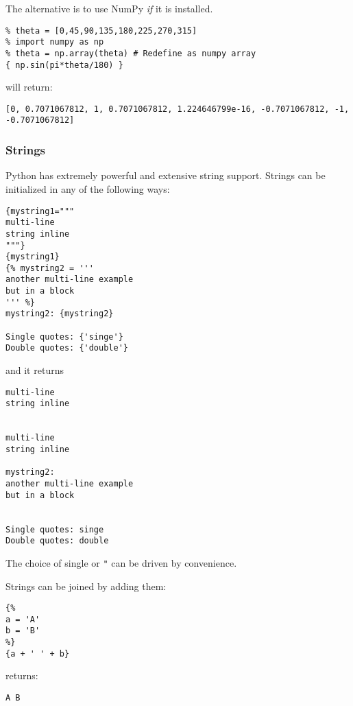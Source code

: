 The alternative is to use NumPy \emph{if} it is installed.

\begin{verbatim}
% theta = [0,45,90,135,180,225,270,315]
% import numpy as np
% theta = np.array(theta) # Redefine as numpy array
{ np.sin(pi*theta/180) }
\end{verbatim}

will return:

\begin{verbatim}
[0, 0.7071067812, 1, 0.7071067812, 1.224646799e-16, -0.7071067812, -1, -0.7071067812]
\end{verbatim}

\subsubsection{Strings}\label{strings}

Python has extremely powerful and extensive string support. Strings can
be initialized in any of the following ways:

\begin{verbatim}
{mystring1="""
multi-line
string inline
"""}
{mystring1}
{% mystring2 = '''
another multi-line example
but in a block
''' %}
mystring2: {mystring2}

Single quotes: {'singe'}
Double quotes: {'double'}
\end{verbatim}

and it returns

\begin{verbatim}
multi-line
string inline


multi-line
string inline

mystring2:
another multi-line example
but in a block


Single quotes: singe
Double quotes: double
\end{verbatim}

The choice of single \texttt{\textquotesingle{}} or \texttt{"} can be
driven by convenience.

Strings can be joined by adding them:

\begin{verbatim}
{%
a = 'A'
b = 'B'
%}
{a + ' ' + b}
\end{verbatim}

returns:

\begin{verbatim}
A B
\end{verbatim}

\label{custom-functions}

